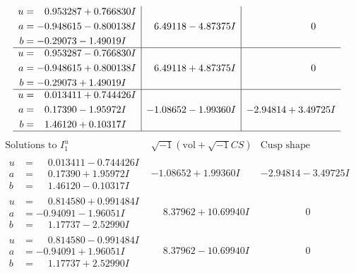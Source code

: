 \documentclass[1p]{elsarticle_modified}
\theoremstyle{definition}
\newcommand{\I}{\sqrt{-1}}
\begin{document}
$$\begin{array}{c|c|c}
\begin{aligned}
u &= \phantom{-}0.953287 + 0.766830 I \\
a &= -0.948615 - 0.800138 I \\
b &= -0.29073 - 1.49019 I\end{aligned}
 & \phantom{-}6.49118 - 4.87375 I & \phantom{-0.000000 } 0 \\ \hline\begin{aligned}
u &= \phantom{-}0.953287 - 0.766830 I \\
a &= -0.948615 + 0.800138 I \\
b &= -0.29073 + 1.49019 I\end{aligned}
 & \phantom{-}6.49118 + 4.87375 I & \phantom{-0.000000 } 0 \\ \hline\begin{aligned}
u &= \phantom{-}0.013411 + 0.744426 I \\
a &= \phantom{-}0.17390 - 1.95972 I \\
b &= \phantom{-}1.46120 + 0.10317 I\end{aligned}
 & -1.08652 - 1.99360 I & -2.94814 + 3.49725 I\\
 \hline 
 \end{array}$$\newpage$$\begin{array}{c|c|c}  
\text{Solutions to }I^u_{1}& \I (\text{vol} + \sqrt{-1}CS) & \text{Cusp shape}\\
 \hline 
\begin{aligned}
u &= \phantom{-}0.013411 - 0.744426 I \\
a &= \phantom{-}0.17390 + 1.95972 I \\
b &= \phantom{-}1.46120 - 0.10317 I\end{aligned}
 & -1.08652 + 1.99360 I & -2.94814 - 3.49725 I \\ \hline\begin{aligned}
u &= \phantom{-}0.814580 + 0.991484 I \\
a &= -0.94091 - 1.96051 I \\
b &= \phantom{-}1.17737 - 2.52990 I\end{aligned}
 & \phantom{-}8.37962 + 10.69940 I & \phantom{-0.000000 } 0 \\ \hline\begin{aligned}
u &= \phantom{-}0.814580 - 0.991484 I \\
a &= -0.94091 + 1.96051 I \\
b &= \phantom{-}1.17737 + 2.52990 I\end{aligned}
 & \phantom{-}8.37962 - 10.69940 I & \phantom{-0.000000 } 0 \\ \hline\begin{aligned}

\end{aligned}
\end{array}$$
\end{document}
